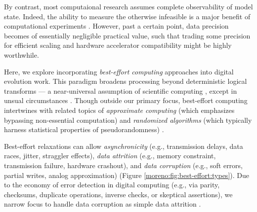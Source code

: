 By contrast, most computaional research assumes complete observability of model state.
Indeed, the ability to measure the otherwise infeasible is a major benefit of computational experiments \cite{lenski2003evolutionary}.
However, past a certain point, data precision becomes of essentially negligible practical value, such that trading some precision for efficient scaling and hardware accelerator compatibility might be highly worthwhile.



Here, we explore incorporating \textit{best-effort computing} approaches into digital evolution work.
This paradigm broadens processing beyond deterministic logical transforms --- a near-universal assumption of scientific computing \cite{chakradhar2010best,rinard2012unsynchronized}, except in unsual circumstances \cite{desell2009robust}.
Though outside our primary focus, best-effort computing intertwines with related topics of \textit{approximate computing} (which emphasizes bypassing non-essential computation) and \textit{randomized algorithms} (which typically harness statistical properties of pseudorandomness) \cite{Buluc2021,mittal2016survey,menon2023approximate}.

Best-effort relaxations can allow \textit{asynchronicity} (e.g., transmission delays, data races, jitter, straggler effects), \textit{data attrition} (e.g., memory constraint, transmission failure, hardware crashout), and \textit{data corruption} (e.g., soft errors, partial writes, analog approximation) (Figure \ref{moreno:fig:best-effort:types}).
Due to the economy of error detection in digital computing \cite{hamming1950error} (e.g., via parity, checksums, duplicate operations, inverse checks, or skeptical assertions), we narrow focus to handle data corruption as simple data attrition \cite{ackley2013beyond}.

